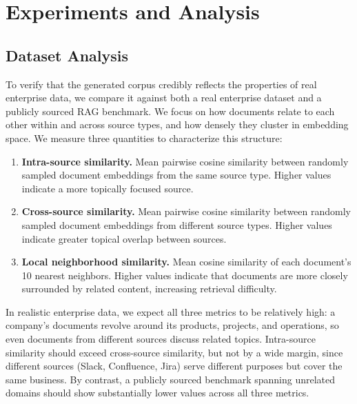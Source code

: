\documentclass{article}
\begin{document}
\section{Experiments and Analysis}
\label{sec:experiments}

\subsection{Dataset Analysis}
\label{sec:dataset_analysis}

To verify that the generated corpus credibly reflects the properties of real enterprise data, we compare it against both a real enterprise dataset and a publicly sourced RAG benchmark. We focus on how documents relate to each other within and across source types, and how densely they cluster in embedding space. We measure three quantities to characterize this structure:

\begin{enumerate}[leftmargin=2em]
  \item \textbf{Intra-source similarity.} Mean pairwise cosine similarity between randomly sampled document embeddings from the same source type. Higher values indicate a more topically focused source.
  \item \textbf{Cross-source similarity.} Mean pairwise cosine similarity between randomly sampled document embeddings from different source types. Higher values indicate greater topical overlap between sources.
  \item \textbf{Local neighborhood similarity.} Mean cosine similarity of each document's 10 nearest neighbors. Higher values indicate that documents are more closely surrounded by related content, increasing retrieval difficulty.
\end{enumerate}

In realistic enterprise data, we expect all three metrics to be relatively high: a company's documents revolve around its products, projects, and operations, so even documents from different sources discuss related topics. Intra-source similarity should exceed cross-source similarity, but not by a wide margin, since different sources (Slack, Confluence, Jira) serve different purposes but cover the same business. By contrast, a publicly sourced benchmark spanning unrelated domains should show substantially lower values across all three metrics.
\end{document}
